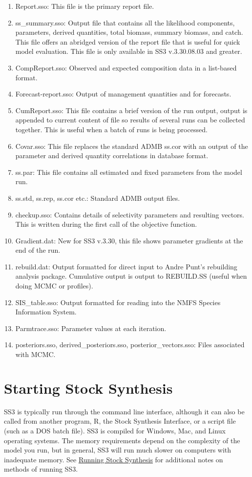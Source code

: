 \begin{enumerate}
		\item Report.sso: This file is the primary report file.
		\item ss\_summary.sso: Output file that contains all the likelihood components, parameters, derived quantities, total biomass, summary biomass, and catch. This file offers an abridged version of the report file that is useful for quick model evaluation. This file is only available in SS3 v.3.30.08.03 and greater.
		\item CompReport.sso: Observed and expected composition data in a list-based format.
		\item Forecast-report.sso: Output of management quantities and for forecasts.
		\item CumReport.sso: This file contains a brief version of the run output, output is appended to current content of file so results of several runs can be collected together.  This is useful when a batch of runs is being processed.
		\item Covar.sso: This file replaces the standard ADMB ss.cor with an output of the parameter and derived quantity correlations in database format.
		\item ss.par: This file contains all estimated and fixed parameters from the model run. 
		\item ss.std, ss.rep, ss.cor etc.:  Standard ADMB output files.
		\item checkup.sso: Contains details of selectivity parameters and resulting vectors.  This is written during the first call of the objective function.
		\item Gradient.dat: New for SS3 v.3.30, this file shows parameter gradients at the end of the run.
		\item rebuild.dat: Output formatted for direct input to Andre Punt's rebuilding analysis package.  Cumulative output is output to REBUILD.SS (useful when doing MCMC or profiles).
		\item SIS\_table.sso: Output formatted for reading into the NMFS Species Information System.
		\item Parmtrace.sso: Parameter values at each iteration.
		\item posteriors.sso, derived\_posteriors.sso, posterior\_vectors.sso: Files associated with MCMC.
	\end{enumerate}

\pagebreak
		
\section{Starting Stock Synthesis}
SS3 is typically run through the command line interface, although it can also be called from another program, R, the Stock Synthesis Interface, or a script file (such as a DOS batch file). SS3 is compiled for Windows, Mac, and Linux operating systems. The memory requirements depend on the complexity of the model you run, but in general, SS3 will run much slower on computers with inadequate memory. See \hyperref[sec:RunningSS]{Running Stock Synthesis} for additional notes on methods of running SS3.

